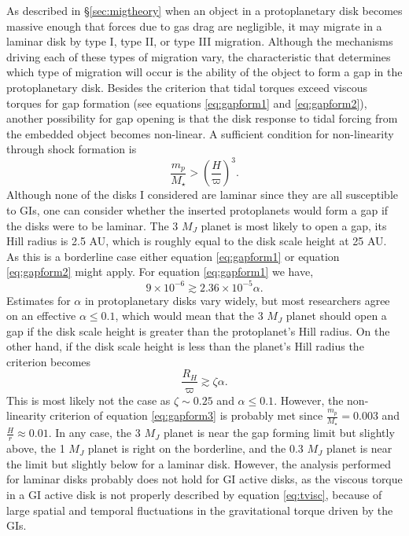As described in \S\ref{sec:migtheory} when an object in a protoplanetary disk becomes massive enough that forces due to gas drag are negligible, it may migrate in a laminar disk by type I, type II, or type III migration. Although the mechanisms driving each of these types of migration vary, the characteristic that determines which type of migration will occur is the ability of the object to form a gap in the protoplanetary disk. Besides the criterion that tidal torques exceed viscous torques for gap formation (see equations \eqref{eq:gapform1} and \eqref{eq:gapform2}), another possibility for gap opening is that the disk response to tidal forcing from the embedded object becomes non-linear. A sufficient condition for non-linearity through shock formation is \citep{korycansky1999}
\begin{equation}
\frac{m_p}{M_\star} > \left(\frac{H}{\varpi}\right)^3.
\label{eq:gapform3}
\end{equation}
Although none of the disks I considered are laminar since they are all susceptible to GIs, one can consider whether the inserted protoplanets would form a gap if the disks were to be laminar. The 3 $M_J$ planet is most likely to open a gap, its Hill radius is 2.5 AU, which is roughly equal to the disk scale height at 25 AU. As this is a borderline case either equation \eqref{eq:gapform1} or equation \eqref{eq:gapform2} might apply. For equation \eqref{eq:gapform1} we have,
\begin{equation}
9 \times 10^{-6} \gtrsim 2.36 \times 10^{-5} \alpha.
\end{equation}
Estimates for $\alpha$ in protoplanetary disks vary widely, but most researchers agree on an effective $\alpha \leq 0.1$, which would mean that the 3 $M_J$ planet should open a gap if the disk scale height is greater than the protoplanet's Hill radius. On the other hand, if the disk scale height is less than the planet's Hill radius the criterion becomes
\begin{equation}
\frac{R_H}{\varpi} \gtrsim \zeta\alpha.
\end{equation} 
This is most likely not the case as $\zeta \sim 0.25$ and $\alpha \leq 0.1$. However, the non-linearity criterion of equation \eqref{eq:gapform3} is probably met since $\frac{m_p}{M_\star} = 0.003$ and $\frac{H}{r} \approx 0.01$. In any case, the 3 $M_J$ planet is near the gap forming limit but slightly above, the 1 $M_J$ planet is right on the borderline, and the 0.3 $M_J$ planet is near the limit but slightly below for a laminar disk. However, the analysis performed for laminar disks probably does not hold for GI active disks, as the viscous torque in a GI active disk is not properly described by equation \eqref{eq:tvisc}, because of large spatial and temporal fluctuations in the gravitational torque driven by the GIs.

